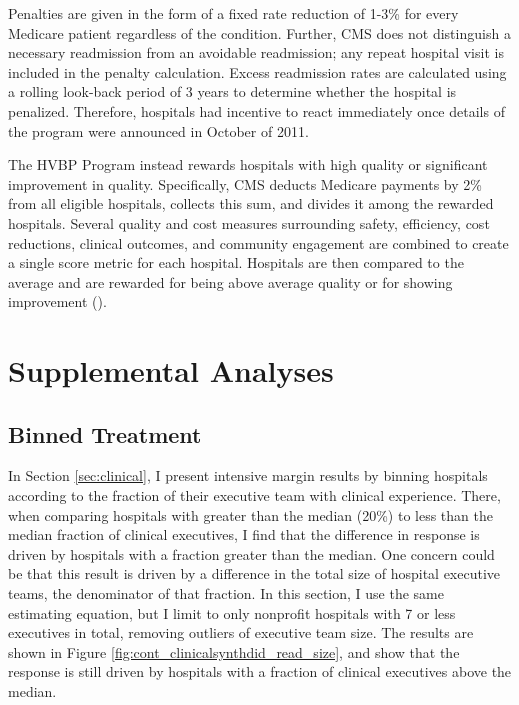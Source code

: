 \documentclass[12pt]{article}
\begin{document}
    Penalties are given in the form of a fixed rate reduction of 1-3\% for every Medicare patient regardless of the condition. Further, CMS does not distinguish a necessary readmission from an avoidable readmission; any repeat hospital visit is included in the penalty calculation. Excess readmission rates are calculated using a rolling look-back period of 3 years to determine whether the hospital is penalized. Therefore, hospitals had incentive to react immediately once details of the program were announced in October of 2011. 

    The HVBP Program instead rewards hospitals with high quality or significant improvement in quality. Specifically, CMS deducts Medicare payments by 2\% from all eligible hospitals, collects this sum, and divides it among the rewarded hospitals. Several quality and cost measures surrounding safety, efficiency, cost reductions, clinical outcomes, and community engagement are combined to create a single score metric for each hospital. Hospitals are then compared to the average and are rewarded for being above average quality or for showing improvement (\cite{CMS_2023}). 

    \section{Supplemental Analyses}

    \subsection{Binned Treatment}\label{app:binned}

    In Section \ref{sec:clinical}, I present intensive margin results by binning hospitals according to the fraction of their executive team with clinical experience. There, when comparing hospitals with greater than the median (20\%) to less than the median fraction of clinical executives, I find that the difference in response is driven by hospitals with a fraction greater than the median. One concern could be that this result is driven by a difference in the total size of hospital executive teams, the denominator of that fraction. In this section, I use the same estimating equation, but I limit to only nonprofit hospitals with 7 or less executives in total, removing outliers of executive team size. The results are shown in Figure \ref{fig:cont_clinicalsynthdid_read_size}, and show that the response is still driven by hospitals with a fraction of clinical executives above the median. 
\end{document}
